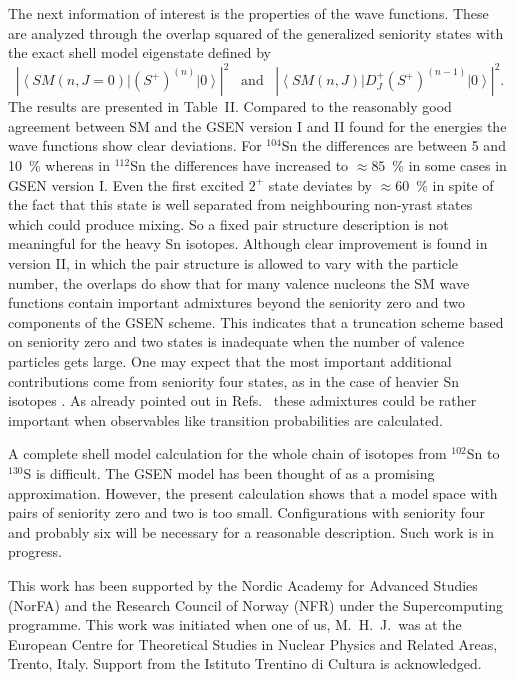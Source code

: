 The next information of interest is the properties of the wave functions.
These are analyzed through the overlap squared of the 
generalized seniority states 
with the exact shell model eigenstate defined by 
\begin{equation}
   \left |\left\langle SM(n,J = 0)\right |(S^{+})^{(n)}\left |0 
    \right\rangle \right |^2 
    \;\;\;  \mbox{and} \;\;\;
    \left | \left\langle SM(n,J)\right |D_{J}^{+}
    (S^{+})^{(n - 1)}\left |0\right\rangle \right |^2.
    \label{eq6}
\end{equation}
The results are presented in Table~II. 
Compared to the reasonably good agreement between SM and 
the GSEN version I and II found for the
energies the wave functions show clear deviations.
For $^{104}$Sn the differences are between 5 and  10~\% whereas in 
$^{112}$Sn the differences have increased 
to $\approx 85$~\% in some cases in GSEN version I. 
Even the first excited $2^{+}$ state deviates 
by $\approx 60$~\% in spite of the fact that
this state is well separated from neighbouring non-yrast 
states which could produce mixing.
So a fixed pair structure description is not meaningful 
for the heavy Sn isotopes. 
Although clear improvement is found in version II,
in which the pair structure is allowed to vary with the particle number,
the overlaps do show that for many valence nucleons
the SM wave
functions contain  important admixtures beyond
the seniority zero and two components of the GSEN scheme. This indicates
that 
a truncation scheme
based on seniority zero and two states is inadequate when the 
number of valence particles gets large.
One may expect that the most important
additional contributions come from  seniority four states, as in the case
of heavier Sn isotopes \cite{Bonsignori85,Allaart88}.
As already pointed out in Refs.\ \cite{Bonsignori85,Allaart88} these 
admixtures could be rather important when observables 
like transition probabilities are calculated.

A complete shell model calculation for the whole chain 
of isotopes from $^{102}$Sn to
$^{130}$S is difficult. The GSEN model has been thought of 
as a promising approximation. However, 
the present calculation shows that a model space with pairs 
of seniority zero and two is too small.
Configurations with seniority four and probably six will be 
necessary for a reasonable description.  Such work is in progress.   


This work has been supported by the 
Nordic Academy for Advanced Studies (NorFA) and the Research Council of
Norway (NFR) under the Supercomputing programme. This work was initiated
when one of us, M.\ H.\ J.\ was at the European Centre for Theoretical
Studies in Nuclear Physics and Related Areas, Trento, Italy. Support from 
the Istituto Trentino di Cultura is acknowledged.



